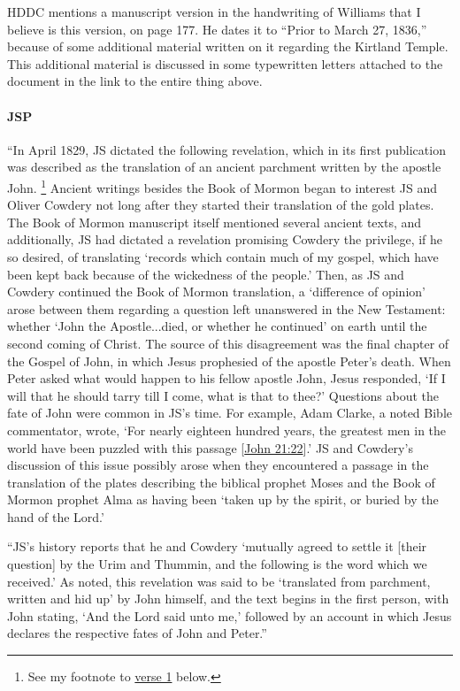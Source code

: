 			HDDC mentions a manuscript version in the handwriting of Williams that I believe is this version, on page 177. He dates it to ``Prior to March 27, 1836,'' because of some additional material written on it regarding the Kirtland Temple. This additional material is discussed in some typewritten letters attached to the document in the link to the entire thing above.
		
		\paragraph{JSP}
		
			``In April 1829, JS dictated the following revelation, which in its first publication was described as the translation of an ancient parchment written by the apostle John.%
				\footnote{%
					See my footnote to \hyperref[DC7-1]{verse 1} below.
					}
			Ancient writings besides the Book of Mormon began to interest JS and Oliver Cowdery not long after they started their translation of the gold plates. The Book of Mormon manuscript itself mentioned several ancient texts, and additionally, JS had dictated a revelation promising Cowdery the privilege, if he so desired, of translating `records which contain much of my gospel, which have been kept back because of the wickedness of the people.' Then, as JS and Cowdery continued the Book of Mormon translation, a `difference of opinion' arose between them regarding a question left unanswered in the New Testament: whether `John the Apostle...died, or whether he continued' on earth until the second coming of Christ. The source of this disagreement was the final chapter of the Gospel of John, in which Jesus prophesied of the apostle Peter's death. When Peter asked what would happen to his fellow apostle John, Jesus responded, `If I will that he should tarry till I come, what is that to thee?' Questions about the fate of John were common in JS's time. For example, Adam Clarke, a noted Bible commentator, wrote, `For nearly eighteen hundred years, the greatest men in the world have been puzzled with this passage [\hyperref[JOHN-21-22]{John 21:22}].' JS and Cowdery's discussion of this issue possibly arose when they encountered a passage in the translation of the plates describing the biblical prophet Moses and the Book of Mormon prophet Alma as having been `taken up by the spirit, or buried by the hand of the Lord.'
			
			``JS's history reports that he and Cowdery `mutually agreed to settle it [their question] by the Urim and Thummin, and the following is the word which we received.' As noted, this revelation was said to be `translated from parchment, written and hid up' by John himself, and the text begins in the first person, with John stating, `And the Lord said unto me,' followed by an account in which Jesus declares the respective fates of John and Peter.''
			
